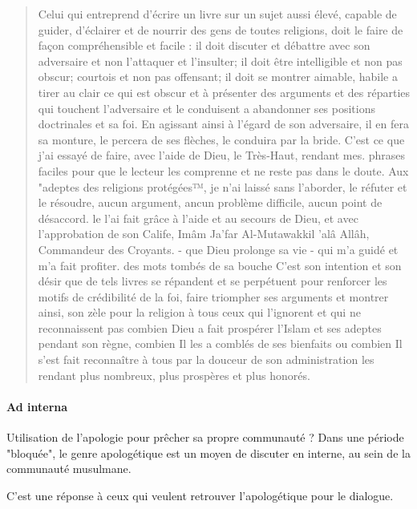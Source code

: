 \begin{quote}
    
Celui qui entreprend d'écrire un livre sur un sujet aussi élevé, capable de guider, d'éclairer et de nourrir des gens de toutes religions, doit le faire de façon compréhensible et facile : il doit discuter et débattre avec son adversaire et non l'attaquer et l'insulter; il doit être intelligible et non pas obscur; courtois et non pas offensant; il doit se montrer aimable, habile a tirer au clair ce qui est obscur et à présenter des arguments et des réparties qui touchent l'adversaire et le conduisent a abandonner ses positions doctrinales et sa foi. En agissant ainsi à l'égard de son adversaire, il en fera sa monture, le percera de ses flèches, le conduira par la bride.
C'est ce que j'ai essayé de faire, avec l'aide de Dieu, le Très-Haut, rendant mes. phrases faciles pour que le lecteur les comprenne et ne reste pas dans le doute.
Aux "adeptes des religions protégées™, je n'ai laissé sans l'aborder, le réfuter et le résoudre, aucun argument, ancun problème difficile, aucun point de désaccord. le l'ai fait grâce à l'aide et au secours de Dieu, et avec l'approbation de son Calife, Imâm Ja'far Al-Mutawakkil 'alâ Allâh, Commandeur des Croyants. - que Dieu prolonge sa vie - qui m'a guidé et m'a fait profiter. des mots tombés de sa bouche C'est son intention et son désir que de tels livres se répandent et se perpétuent pour renforcer les motifs de crédibilité de la foi, faire triompher ses arguments et montrer ainsi, son zèle pour la religion à tous ceux qui l'ignorent et qui ne reconnaissent pas combien Dieu a fait prospérer l'Islam et ses adeptes pendant son règne, combien Il les a comblés de ses bienfaits ou combien Il s'est fait reconnaître à tous par la douceur de son administration les rendant plus nombreux, plus prospères et plus honorés.


    
\end{quote}
\paragraph{Ad interna}
Utilisation de l'apologie pour prêcher sa propre communauté ? Dans une période "bloquée", le genre apologétique est un moyen de discuter en interne, au sein de la communauté musulmane.

C'est une réponse à ceux qui veulent retrouver l'apologétique pour le dialogue.

